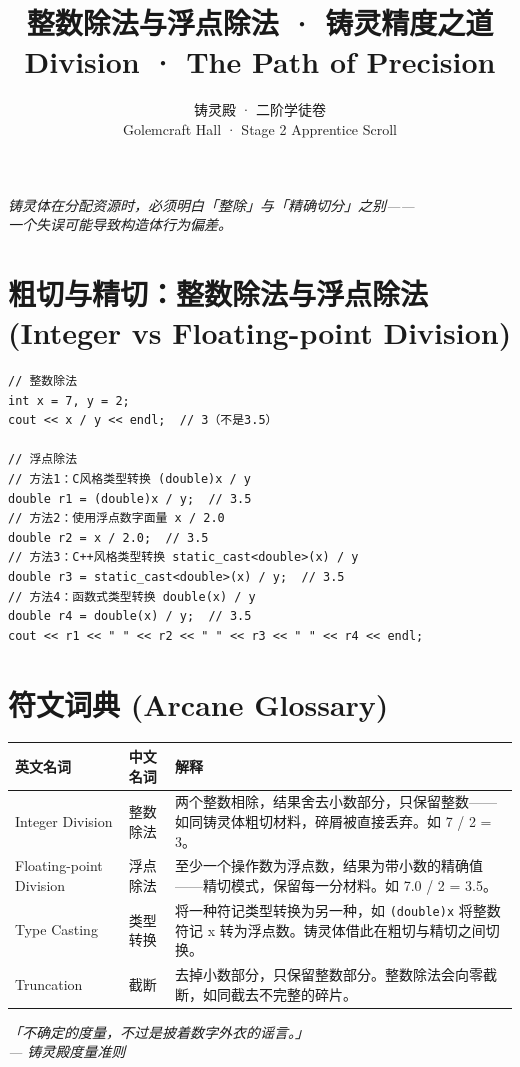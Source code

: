 \documentclass[UTF8,a4paper,12pt]{ctexart}
\title{整数除法与浮点除法 · 铸灵精度之道\\[4pt]
\large Division · The Path of Precision}
\author{铸灵殿 · 二阶学徒卷\\[2pt]
\small Golemcraft Hall · Stage 2 Apprentice Scroll}
\date{}
\begin{document}
\maketitle

\begin{center}
\textit{铸灵体在分配资源时，必须明白「整除」与「精确切分」之别——\\
一个失误可能导致构造体行为偏差。}
\end{center}

\vspace{0.5em}

\section*{粗切与精切：整数除法与浮点除法 \\ (Integer vs Floating-point Division)}

\begin{lstlisting}
// 整数除法
int x = 7, y = 2;
cout << x / y << endl;  // 3（不是3.5）

// 浮点除法
// 方法1：C风格类型转换 (double)x / y
double r1 = (double)x / y;  // 3.5
// 方法2：使用浮点数字面量 x / 2.0
double r2 = x / 2.0;  // 3.5
// 方法3：C++风格类型转换 static_cast<double>(x) / y
double r3 = static_cast<double>(x) / y;  // 3.5
// 方法4：函数式类型转换 double(x) / y
double r4 = double(x) / y;  // 3.5
cout << r1 << " " << r2 << " " << r3 << " " << r4 << endl;
\end{lstlisting}

\section*{符文词典 (Arcane Glossary)}

\begin{center}
\begin{tabular}{|l|l|p{10cm}|}
\hline
\textbf{英文名词} & \textbf{中文名词} & \textbf{解释} \\
\hline
Integer Division & 整数除法 & 两个整数相除，结果舍去小数部分，只保留整数——如同铸灵体粗切材料，碎屑被直接丢弃。如 7 / 2 = 3。 \\
\hline
Floating-point Division & 浮点除法 & 至少一个操作数为浮点数，结果为带小数的精确值——精切模式，保留每一分材料。如 7.0 / 2 = 3.5。 \\
\hline
Type Casting & 类型转换 & 将一种符记类型转换为另一种，如 \texttt{(double)x} 将整数符记 x 转为浮点数。铸灵体借此在粗切与精切之间切换。 \\
\hline
Truncation & 截断 & 去掉小数部分，只保留整数部分。整数除法会向零截断，如同截去不完整的碎片。 \\
\hline
\end{tabular}
\end{center}

\vfill
\begin{center}
\textit{「不确定的度量，不过是披着数字外衣的谣言。」\\
--- 铸灵殿度量准则}
\end{center}
\end{document}
